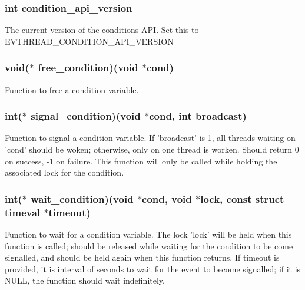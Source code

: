 \subsubsection[{condition\-\_\-api\-\_\-version}]{\setlength{\rightskip}{0pt plus 5cm}int {\bf condition\-\_\-api\-\_\-version}}\label{structevthread__condition__callbacks_af2f89f88c8bcf3bf95b078559340d522}
\-The current version of the conditions \-A\-P\-I. \-Set this to \-E\-V\-T\-H\-R\-E\-A\-D\-\_\-\-C\-O\-N\-D\-I\-T\-I\-O\-N\-\_\-\-A\-P\-I\-\_\-\-V\-E\-R\-S\-I\-O\-N 
\subsubsection[{free\-\_\-condition}]{\setlength{\rightskip}{0pt plus 5cm}void($\ast$ {\bf free\-\_\-condition})(void $\ast$cond)}\label{structevthread__condition__callbacks_a4b553f2b383f8962091b971be2d42820}
\-Function to free a condition variable. 
\subsubsection[{signal\-\_\-condition}]{\setlength{\rightskip}{0pt plus 5cm}int($\ast$ {\bf signal\-\_\-condition})(void $\ast$cond, int broadcast)}\label{structevthread__condition__callbacks_ad081cb82eb1b8cd75538ca762cb0531a}
\-Function to signal a condition variable. \-If 'broadcast' is 1, all threads waiting on 'cond' should be woken; otherwise, only on one thread is worken. \-Should return 0 on success, -\/1 on failure. \-This function will only be called while holding the associated lock for the condition. 
\subsubsection[{wait\-\_\-condition}]{\setlength{\rightskip}{0pt plus 5cm}int($\ast$ {\bf wait\-\_\-condition})(void $\ast$cond, void $\ast$lock, const struct timeval $\ast$timeout)}\label{structevthread__condition__callbacks_a9b6dc6fa81952b82fdef25f4b96e3b91}
\-Function to wait for a condition variable. \-The lock 'lock' will be held when this function is called; should be released while waiting for the condition to be come signalled, and should be held again when this function returns. \-If timeout is provided, it is interval of seconds to wait for the event to become signalled; if it is \-N\-U\-L\-L, the function should wait indefinitely.

